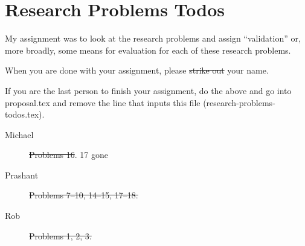 \section*{Research Problems Todos}

My assignment was to look at the research problems and assign ``validation'' or, more broadly, some means for evaluation for each of these research problems.

When you are done with your assignment, please \sout{strike out} your name.

If you are the last person to finish your assignment, do the above and go into proposal.tex and remove the line that inputs this file (research-problems-todos.tex).

\begin{description}
\item[Michael] \sout{Problems 16}.  17 gone
\item[Prashant] \sout{Problems 7--10, 14--15, 17--18.} 
\item[Rob] \sout{Problems 1, 2, 3.}
\end{description}

\newpage